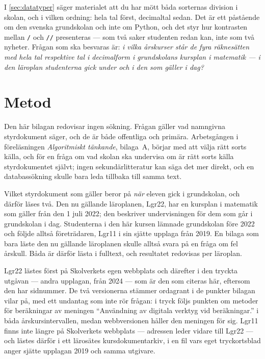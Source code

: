 I \cref{sec:datatyper} säger materialet att du har mött båda sorternas
division i skolan, och i vilken ordning: hela tal först, decimaltal
sedan.  Det är ett påstående om den svenska grundskolan och inte om
Python, och det styr hur kontrasten mellan \texttt{/} och
\texttt{//} presenteras --- som två saker studenten redan
kan, inte som två nyheter.  Frågan som ska besvaras är: \emph{i vilka
årskurser står de fyra räknesätten med hela tal respektive tal i
decimalform i grundskolans kursplan i matematik --- i den läroplan
studenterna gick under och i den som gäller i dag?}

\section{Metod}
\label{sec:lgr22-metod}

Den här bilagan redovisar ingen sökning.  Frågan gäller vad namngivna
styrdokument
säger, och de är både offentliga och primära.  Arbetsgången i
föreläsningen \emph{Algoritmiskt tänkande}, bilaga~A, börjar med att
välja rätt sorts källa, och för
en
fråga om vad skolan ska undervisa om är rätt sorts källa
styrdokumentet självt; ingen sekundärlitteratur kan säga det mer
direkt, och en databassökning skulle bara leda tillbaka till samma
text.

Vilket styrdokument som gäller beror på \emph{när} eleven gick i
grundskolan, och därför läses två.  Den nu gällande läroplanen, Lgr22,
har en kursplan i matematik som gäller från den 1 juli
2022\autocite[55--57]{Skolverket2022Lgr22}; den beskriver undervisningen
för dem som går i grundskolan i dag.  Studenterna i den här kursen
lämnade grundskolan före 2022 och följde alltså företrädaren, Lgr11 i
sin sjätte upplaga från 2019\autocite[55--56]{Skolverket2019Lgr11}.  En
bilaga som bara läste den nu gällande läroplanen skulle alltså svara
på en fråga om fel årskull.  Båda är därför lästa i fulltext, och
resultatet redovisas per läroplan.

Lgr22 lästes först på Skolverkets egen webbplats och därefter i den
tryckta utgåvan --- andra upplagan, från 2024 --- som är den som citeras
här, eftersom den har sidnummer.  De två versionerna stämmer ordagrant i
de punkter bilagan vilar på, med ett undantag som inte rör frågan: i
tryck följs punkten om metoder för beräkningar av meningen
\enquote{Användning av digitala verktyg vid beräkningar.} i båda
årskursintervallen, medan webbversionen håller den meningen för sig.
Lgr11 finns inte längre på Skolverkets webbplats --- adressen leder
vidare till Lgr22 --- och lästes därför i ett lärosätes
kursdokumentarkiv, i en fil vars eget tryckortsblad anger sjätte
upplagan 2019 och samma utgivare.

